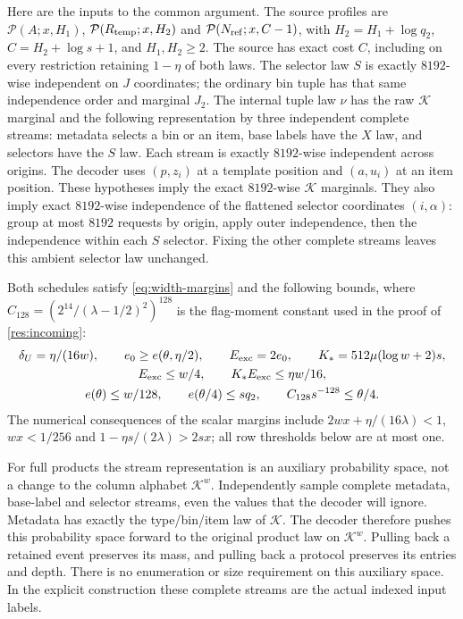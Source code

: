 \documentclass[11pt]{article} \usepackage[utf8]{inputenc}
\theoremstyle{plain} \newtheorem{theorem}{Theorem}[section]
\theoremstyle{definition} \newaliascnt{definition}{theorem}
\newcommand{\RP}[3]{\mathcal{P}(#1;#2,#3)}
\begin{document}
Here are the inputs to the common argument. The source profiles are
$\RP{A}{x}{H_1}$, $\RP{R_{\rm temp}}{x}{H_2}$ and
$\RP{N_{\rm ref}}{x}{C-1}$, with $H_2=H_1+\log q_2$,
$C=H_2+\log s+1$, and $H_1,H_2\ge2$.
The source has exact cost $C$, including on every restriction retaining
$1-\eta$ of both laws. The selector law $S$ is exactly $8192$-wise
independent on $J$ coordinates; the ordinary bin tuple has that same
independence order and marginal $J_2$. The internal tuple law $\nu$ has
the raw $\mathcal K$ marginal and the following representation by three
independent complete streams: metadata selects a bin or an item, base
labels have the $X$ law, and selectors have the $S$ law. Each stream is
exactly $8192$-wise independent across origins. The decoder uses
$(p,z_i)$ at a template position and $(a,u_i)$ at an item position.
These hypotheses imply the exact $8192$-wise $\mathcal K$ marginals.
They also imply exact $8192$-wise independence of the flattened selector
coordinates $(i,\alpha)$: group at most $8192$ requests by origin, apply
outer independence, then the independence within each $S$ selector.
Fixing the other complete streams leaves this ambient selector law unchanged.

Both schedules satisfy \eqref{eq:width-margins} and the following bounds,
where $C_{128}=(2^{14}/(\lambda-1/2)^2)^{128}$ is the flag-moment
constant used in the proof of \cref{res:incoming}:
\begin{equation}\label{eq:internal-hypotheses}
\begin{gathered}
\delta_U=\eta/(16w),\qquad
 e_0\ge e(\theta,\eta/2),\qquad E_{\rm exc}=2e_0,\qquad
 K_*=512\mu(\log w+2)s,\\
 E_{\rm exc}\le w/4,\qquad K_*E_{\rm exc}\le\eta w/16,\\
 e(\theta)\le w/128,\qquad e(\theta/4)\le sq_2,\qquad
 C_{128}s^{-128}\le\theta/4.
\end{gathered}
\end{equation}
The numerical consequences of the scalar margins include
$2wx+\eta/(16\lambda)<1$, $wx<1/256$ and
$1-\eta s/(2\lambda)>2sx$; all row thresholds below are at most one.

For full products the stream representation is an auxiliary probability
space, not a change to the column alphabet $\mathcal K^w$. Independently
sample complete metadata, base-label and selector streams, even the values
that the decoder will ignore. Metadata has exactly the type/bin/item law
of $\mathcal K$. The decoder therefore pushes this probability space
forward to the original product law on $\mathcal K^w$. Pulling back a
retained event preserves its mass, and pulling back a protocol preserves
its entries and depth. There is no enumeration or size requirement on
this auxiliary space. In the explicit construction these complete streams
are the actual indexed input labels.
\end{document}
